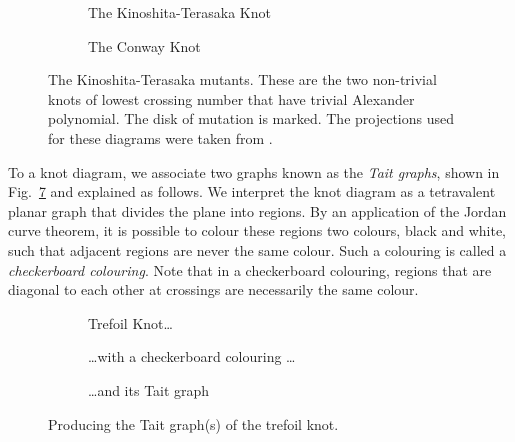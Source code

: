 \documentclass[12pt]{report}
\begin{document}
\begin{figure}[hbt!]
	\centering
	\hspace*{\fill}
	\begin{subfigure}[b]{0.4 \textwidth}
		\centering
		\def\svgscale{0.25}
		
		\caption{The Kinoshita-Terasaka Knot}
		\label{fig:kinoshita-terasaka-knot}
	\end{subfigure}
	\hspace*{\fill} \hspace*{\fill}	\hspace*{\fill}
	\begin{subfigure}[b]{0.4 \textwidth}
		\centering
		\def\svgscale{0.25}
		
		\caption{The Conway Knot}
		\label{fig:conway-knot}
	\end{subfigure}
	\hspace*{\fill} 
	\caption{The Kinoshita-Terasaka mutants. These are the two non-trivial knots of lowest crossing number that have trivial Alexander polynomial. The disk of mutation is marked. The projections used for these diagrams were taken from \cite[Fig.~2.32]{the-knot-book}.}
	\label{fig:kinoshita-terasaka-mutants}
\end{figure}

To a knot diagram, we associate two graphs known as the \textit{Tait graphs}, shown in Fig.~\ref{fig:tait-example} and explained as follows. We interpret the knot diagram as a tetravalent planar graph that divides the plane into regions. By an application of the Jordan curve theorem, it is possible to colour these regions two colours, black and white, such that adjacent regions are never the same colour. Such a colouring is called a \textit{checkerboard colouring}. Note that in a checkerboard colouring, regions that are diagonal to each other at crossings are necessarily the same colour.

\begin{figure}[hbt]
	\centering
	\hspace*{\fill}
	\begin{subfigure}[b]{0.3 \textwidth}
		\centering
		\def\svgscale{0.2}
		
		\caption{Trefoil Knot\dots}
		\label{fig:trefoil-blank}
	\end{subfigure}
	\hspace*{\fill}
	\begin{subfigure}[b]{0.3 \textwidth}
		\centering
		\def\svgscale{0.2}
		
		\caption{\dots with a checkerboard colouring \dots}
		\label{fig:trefoil-checker}
	\end{subfigure}
	\hspace*{\fill}
	\begin{subfigure}[b]{0.3 \textwidth}
		\centering
		\def\svgscale{0.2}
		
		\caption{\dots and its Tait graph}
		\label{fig:trefoil-checker-tait}
	\end{subfigure}
	\hspace*{\fill}
	\caption{Producing the Tait graph(s) of the trefoil knot.}
	\label{fig:tait-example}
\end{figure}
\end{document}
